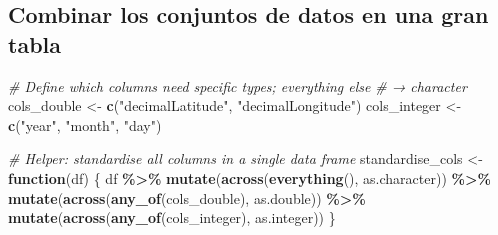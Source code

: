 \documentclass[sn-apa,pdflatex]{sn-jnl}
\newenvironment{Shaded}{\begin{snugshade}}{\end{snugshade}}
\newcommand{\CommentTok}[1]{\textcolor[rgb]{0.56,0.35,0.01}{\textit{#1}}}
\newcommand{\ControlFlowTok}[1]{\textcolor[rgb]{0.13,0.29,0.53}{\textbf{#1}}}
\newcommand{\FunctionTok}[1]{\textcolor[rgb]{0.13,0.29,0.53}{\textbf{#1}}}
\newcommand{\NormalTok}[1]{#1}
\newcommand{\OtherTok}[1]{\textcolor[rgb]{0.56,0.35,0.01}{#1}}
\newcommand{\SpecialCharTok}[1]{\textcolor[rgb]{0.81,0.36,0.00}{\textbf{#1}}}
\newcommand{\StringTok}[1]{\textcolor[rgb]{0.31,0.60,0.02}{#1}}
\begin{document}
\subsection{Combinar los conjuntos de datos en una gran
tabla}\label{combinar-los-conjuntos-de-datos-en-una-gran-tabla}

\begin{Shaded}
\begin{Highlighting}[]
\CommentTok{\# Define which columns need specific types; everything else}
\CommentTok{\# → character}
\NormalTok{cols\_double }\OtherTok{\textless{}{-}} \FunctionTok{c}\NormalTok{(}\StringTok{"decimalLatitude"}\NormalTok{, }\StringTok{"decimalLongitude"}\NormalTok{)}
\NormalTok{cols\_integer }\OtherTok{\textless{}{-}} \FunctionTok{c}\NormalTok{(}\StringTok{"year"}\NormalTok{, }\StringTok{"month"}\NormalTok{, }\StringTok{"day"}\NormalTok{)}

\CommentTok{\# Helper: standardise all columns in a single data frame}
\NormalTok{standardise\_cols }\OtherTok{\textless{}{-}} \ControlFlowTok{function}\NormalTok{(df) \{}
\NormalTok{    df }\SpecialCharTok{\%\textgreater{}\%}
        \FunctionTok{mutate}\NormalTok{(}\FunctionTok{across}\NormalTok{(}\FunctionTok{everything}\NormalTok{(), as.character)) }\SpecialCharTok{\%\textgreater{}\%}
        \FunctionTok{mutate}\NormalTok{(}\FunctionTok{across}\NormalTok{(}\FunctionTok{any\_of}\NormalTok{(cols\_double), as.double)) }\SpecialCharTok{\%\textgreater{}\%}
        \FunctionTok{mutate}\NormalTok{(}\FunctionTok{across}\NormalTok{(}\FunctionTok{any\_of}\NormalTok{(cols\_integer), as.integer))}
\NormalTok{\}}


\end{Highlighting}
\end{Shaded}
\end{document}
